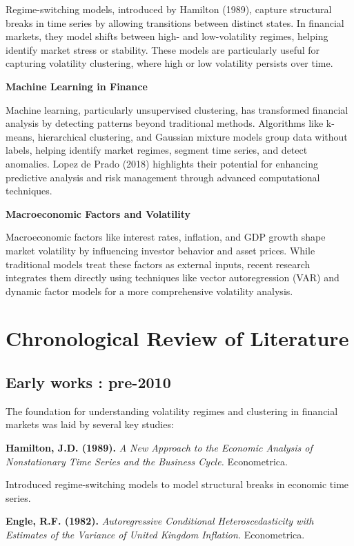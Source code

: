 Regime-switching models, introduced by Hamilton (1989), capture structural breaks in time series by allowing transitions between distinct states. In financial markets, they model shifts between high- and low-volatility regimes, helping identify market stress or stability. These models are particularly useful for capturing volatility clustering, where high or low volatility persists over time.

\textbf{Machine Learning in Finance}

Machine learning, particularly unsupervised clustering, has transformed financial analysis by detecting patterns beyond traditional methods. Algorithms like k-means, hierarchical clustering, and Gaussian mixture models group data without labels, helping identify market regimes, segment time series, and detect anomalies. Lopez de Prado (2018) highlights their potential for enhancing predictive analysis and risk management through advanced computational techniques.

\textbf{Macroeconomic Factors and Volatility}

Macroeconomic factors like interest rates, inflation, and GDP growth shape market volatility by influencing investor behavior and asset prices. While traditional models treat these factors as external inputs, recent research integrates them directly using techniques like vector autoregression (VAR) and dynamic factor models for a more comprehensive volatility analysis.

\section{Chronological Review of Literature}

\subsection{Early works : pre-2010}

The foundation for understanding volatility regimes and clustering in financial markets was laid by several key studies:

\textbf{Hamilton, J.D. (1989).} \textit{A New Approach to the Economic Analysis of Nonstationary Time Series and the Business Cycle.} Econometrica.

Introduced regime-switching models to model structural breaks in economic time series.

\textbf{Engle, R.F. (1982).} \textit{Autoregressive Conditional Heteroscedasticity with Estimates of the Variance of United Kingdom Inflation.} Econometrica.

